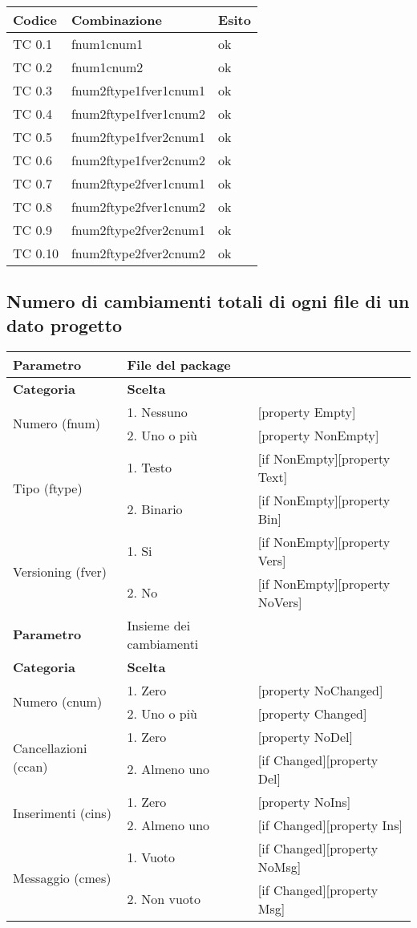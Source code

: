 \vspace{1cm}

\begin{tabular}{|p{3cm}|p{7cm}|p{3cm}|}
	\hline
	\rowcolor{Gray}
	\textbf{Codice} & \textbf{Combinazione} & \textbf{Esito}\tabularnewline
	\hline
	TC 0.1			& fnum1cnum1			& ok \tabularnewline
	\hline
	TC 0.2			& fnum1cnum2			& ok \tabularnewline
	\hline
	TC 0.3			& fnum2ftype1fver1cnum1		& ok \tabularnewline
	\hline
	TC 0.4			& fnum2ftype1fver1cnum2		& ok \tabularnewline
	\hline
	TC 0.5			& fnum2ftype1fver2cnum1		& ok \tabularnewline
	\hline
	TC 0.6			& fnum2ftype1fver2cnum2		& ok \tabularnewline
	\hline
	TC 0.7			& fnum2ftype2fver1cnum1		& ok \tabularnewline
	\hline
	TC 0.8			& fnum2ftype2fver1cnum2		& ok \tabularnewline
	\hline
	TC 0.9			& fnum2ftype2fver2cnum1		& ok \tabularnewline
	\hline
	TC 0.10			&fnum2ftype2fver2cnum2		& ok \tabularnewline
	\hline
\end{tabular}
\clearpage




\subsection{Numero di cambiamenti totali di ogni file di un dato progetto}
		
\begin{tabular}{|p{4cm}|p{4cm}p{5cm}|}
	\hline
	\cellcolor{Gray} \textbf{Parametro}		& File del package	&											\tabularnewline
	\hline
	\rowcolor{Gray}
	\textbf{Categoria} 						& \textbf{Scelta}			&									\tabularnewline
	\hline
	\multirow{2}{*}{Numero (fnum)} 			& 1. Nessuno				&	[property Empty] 				\tabularnewline
	\cline{2-3}
											& 2. Uno o più				&	[property NonEmpty]				\tabularnewline
	\hline
	\multirow{2}{*}{Tipo (ftype)} 			& 1. Testo					&	[if NonEmpty][property Text] 	\tabularnewline
	\cline{2-3}
											& 2. Binario				&	[if NonEmpty][property Bin]		\tabularnewline
	\hline
	\multirow{2}{*}{Versioning (fver)}		& 1. Si						&	[if NonEmpty][property Vers]	\tabularnewline
	\cline{2-3}
											& 2. No						&	[if NonEmpty][property NoVers]	\tabularnewline
	\hline
	
	
	\cellcolor{Gray} \textbf{Parametro}		& Insieme dei cambiamenti	&									\tabularnewline
	\hline
	\rowcolor{Gray}
	\textbf{Categoria} 						& \textbf{Scelta}			&									\tabularnewline
	\hline
	\multirow{2}{*}{Numero (cnum)} 			& 1. Zero 					&	[property NoChanged]			\tabularnewline
	\cline{2-3}
											& 2. Uno o più				&	[property Changed]				\tabularnewline
	\hline
	\multirow{2}{*}{Cancellazioni (ccan)} 	& 1. Zero	 				&	[property NoDel] 				\tabularnewline
	\cline{2-3}
											& 2. Almeno uno				&	[if Changed][property Del]		\tabularnewline
	\hline
	\multirow{2}{*}{Inserimenti (cins)} 	& 1. Zero 					&	[property NoIns] 				\tabularnewline
	\cline{2-3}
											& 2. Almeno uno 			&	[if Changed][property Ins]		\tabularnewline
	\hline
	\multirow{2}{*}{Messaggio (cmes)} 		& 1. Vuoto 					&	[if Changed][property NoMsg] 	\tabularnewline
	\cline{2-3}
											& 2. Non vuoto 				&	[if Changed][property Msg]		\tabularnewline
	\hline			
	
\end{tabular}

